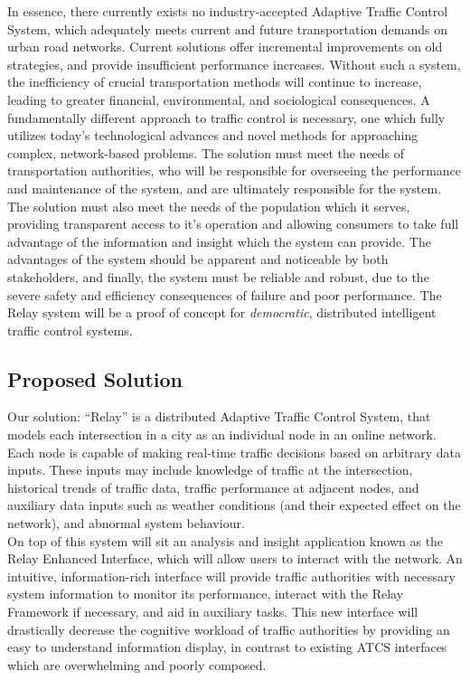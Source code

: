 \documentclass{article}
\begin{document}
In essence, there currently exists no industry-accepted Adaptive Traffic Control System, which adequately meets current and future transportation demands on urban road networks.
Current solutions offer incremental improvements on old strategies, and provide insufficient performance increases.
Without such a system, the inefficiency of crucial transportation methods will continue to increase, leading to greater financial, environmental, and sociological consequences.
A fundamentally different approach to traffic control is necessary, one which fully utilizes today's technological advances and novel methods for approaching complex, network-based problems.
The solution must meet the needs of transportation authorities, who will be responsible for overseeing the performance and maintenance of the system, and are ultimately responsible for the system.
The solution must also meet the needs of the population which it serves, providing transparent access to it's operation and allowing consumers to take full advantage of the information and insight which the system can provide.
The advantages of the system should be apparent and noticeable by both stakeholders, and finally, the system must be reliable and robust, due to the severe safety and efficiency consequences of failure and poor performance. The Relay system will be a proof of concept for \emph{democratic}, distributed intelligent traffic control systems.\\

\subsection{Proposed Solution}

Our solution: ``Relay'' is a distributed Adaptive Traffic Control System, that models each intersection in a city as an individual node in an online network.
Each node is capable of making real-time traffic decisions based on arbitrary data inputs.
These inputs may include knowledge of traffic at the intersection, historical trends of traffic data, traffic performance at adjacent nodes, and auxiliary data inputs such as weather conditions (and their expected effect on the network), and abnormal system behaviour.\\

On top of this system will sit an analysis and insight application known as the Relay Enhanced Interface, which will allow users to interact with the network.
An intuitive, information-rich interface will provide traffic authorities with necessary system information to monitor its performance, interact with the Relay Framework if necessary, and aid in auxiliary tasks.
This new interface will drastically decrease the cognitive workload of traffic authorities by providing an easy to understand information display, in contrast to existing ATCS interfaces which are overwhelming and poorly composed.\\
\end{document}
